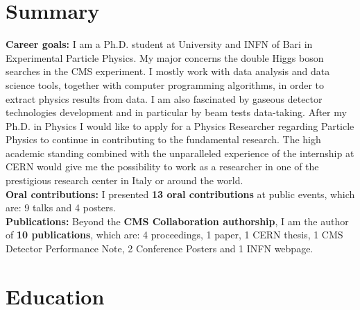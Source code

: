 \documentclass[11pt]{res}
\newcommand{\MarginText}[1]{\section{#1}\vspace{10pt}}
\begin{document}
\newcommand{\DOI}[1]{\href{https://doi.org/#1}{doi:#1}}
\begin{resume}
\MarginText{Summary}

\textbf{Career goals:} I am a Ph.D. student at University and INFN of Bari in Experimental Particle Physics. My major concerns the double Higgs boson searches in the CMS experiment. I mostly work with data analysis and data science tools, together with computer programming algorithms, in order to extract physics results from data. I am also fascinated by gaseous detector technologies development and in particular by beam tests data-taking. After my Ph.D. in Physics I would like to apply for a Physics Researcher regarding Particle Physics to continue in contributing to the fundamental research. The high academic standing combined with the unparalleled experience of the internship at CERN would give me the possibility to work as a researcher in one of the prestigious research center in Italy or around the world.\\
\textbf{Oral contributions:} I presented \textbf{13 oral contributions} at public events, which are: 9 talks and 4 posters.\\
\textbf{Publications:} Beyond the \textbf{CMS Collaboration authorship}, I am the author of \textbf{10 publications}, which are: 4 proceedings, 1 paper, 1 CERN thesis, 1 CMS Detector Performance Note, 2 Conference Posters and 1 INFN webpage.\\

\MarginText{Education}


\end{resume}
\end{document}
